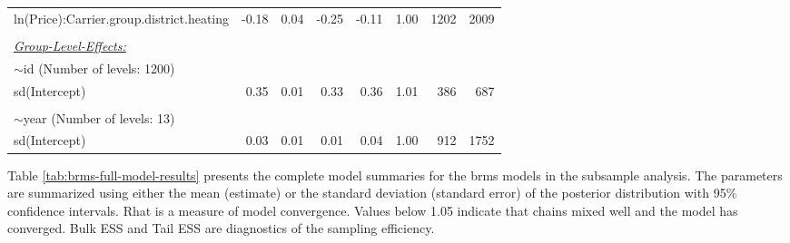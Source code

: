 \documentclass[12pt,twoside]{reedthesis}
\begin{document}
\begin{longtable}[c]{lrrrrrrr}
ln(Price):Carrier.group.district.heating & -0.18 & 0.04 & -0.25 & -0.11 & 1.00 & 1202 & 2009 \\
 &  &  &  &  &  &  &  \\
{\ul \textit{Group-Level-Effects:}} &  &  &  &  &  &  &  \\
$\sim$id (Number of levels: 1200) &  &  &  &  &  &  &  \\
sd(Intercept) & 0.35 & 0.01 & 0.33 & 0.36 & 1.01 & 386 & 687 \\
 &  &  &  &  &  &  &  \\
$\sim$year (Number of levels: 13) &  &  &  &  &  &  &  \\
sd(Intercept) & 0.03 & 0.01 & 0.01 & 0.04 & 1.00 & 912 & 1752 \\ \hline
\end{longtable}
\normalsize

\noindent
Table \ref{tab:brms-full-model-results} presents the complete model summaries for the brms models in the subsample analysis. The parameters are summarized using either the mean (estimate) or the standard deviation (standard error) of the posterior distribution with 95\% confidence intervals. Rhat is a measure of model convergence. Values below 1.05 indicate that chains mixed well and the model has converged. Bulk ESS and Tail ESS are diagnostics of the sampling efficiency.
\end{document}
